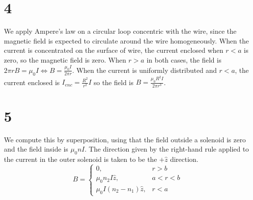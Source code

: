 \documentclass{article}
\begin{document}
\section*{4}
We apply Ampere's law on a circular loop concentric with the wire, since the magnetic field is expected to circulate around the wire homogeneously. When the current is concentrated on the surface of wire, the current enclosed when $r < a$ is zero, so the magnetic field is zero. When $r > a$ in both cases, the field is $2\pi rB=\mu_0I\Leftrightarrow B = \frac{\mu_0 I}{2\pi r}$.
When the current is uniformly distributed and $r < a$, the current enclosed is $I_{enc}=\frac{R^2}{r^2}I$ so the field is $B=\frac{\mu_0R^2I}{2\pi r^3}$.

\section*{5}
We compute this by superposition, using that the field outside a solenoid is zero and the field inside is $\mu_0n I$. The direction given by the right-hand rule applied to the current in the outer solenoid is taken to be the $+\hat{z}$ direction.
\[B=\begin{cases}
    0, & r > b \\
    \mu_0n_2I\hat{z}, & a < r < b \\
    \mu_0I(n_2-n_1)\hat{z}, & r < a
  \end{cases}\]
\end{document}
